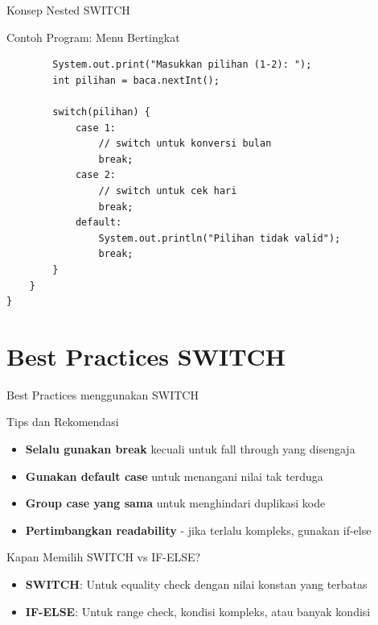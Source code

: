 \documentclass{beamer}
\begin{document}
\begin{frame}[fragile]{Konsep Nested SWITCH}
  \begin{exampleblock}{Contoh Program: Menu Bertingkat}
    \begin{lstlisting}
        System.out.print("Masukkan pilihan (1-2): ");
        int pilihan = baca.nextInt();
        
        switch(pilihan) {
            case 1:
                // switch untuk konversi bulan
                break;
            case 2:
                // switch untuk cek hari
                break;
            default: 
                System.out.println("Pilihan tidak valid");
                break;
        }
    }
}
    \end{lstlisting}
  \end{exampleblock}
\end{frame}

\section{Best Practices SWITCH}
\begin{frame}{Best Practices menggunakan SWITCH}
  \begin{alertblock}{Tips dan Rekomendasi}
    \begin{itemize}
      \item \textbf{Selalu gunakan break} kecuali untuk fall through yang disengaja
      \item \textbf{Gunakan default case} untuk menangani nilai tak terduga
      \item \textbf{Group case yang sama} untuk menghindari duplikasi kode
      \item \textbf{Pertimbangkan readability} - jika terlalu kompleks, gunakan if-else
    \end{itemize}
  \end{alertblock}

  \begin{block}{Kapan Memilih SWITCH vs IF-ELSE?}
    \begin{itemize}
      \item \textbf{SWITCH}: Untuk equality check dengan nilai konstan yang terbatas
      \item \textbf{IF-ELSE}: Untuk range check, kondisi kompleks, atau banyak kondisi
    \end{itemize}
  \end{block}
\end{frame}
\end{document}
